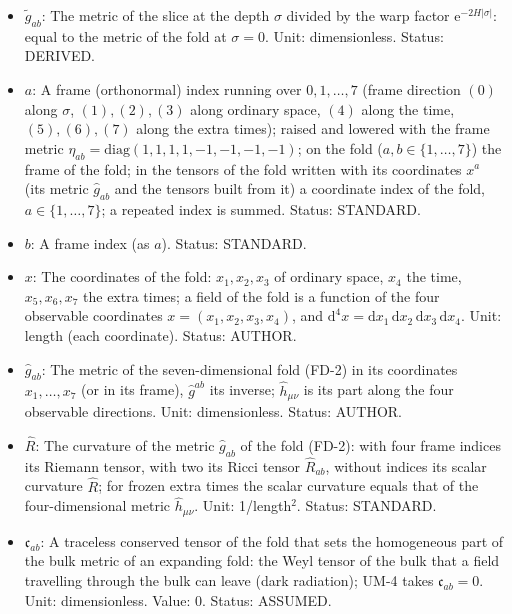 \documentclass[
  10pt,
]{article}
\begin{document}
\begin{itemize}
  \(\pi/(6H)\) of \(x_0\), the warp factor
  \(\mathrm{e}^{-2H\lvert\sigma\rvert}\) of the metric, the cosmological
  constant \(\Lambda = -21H^2\) and the tension
  \(\kappa\lambda_{\mathrm{F}} = 12H\) of the fold; in UM-4 a free
  parameter, bounded from below by the propagation of the gauge fields
  in the bulk. Unit: GeV (1/length). Value: \(H > 2534\) GeV, about 2.5
  TeV (from the invisible width of the Z boson). Status: AUTHOR.
\item
  \(\tilde g_{ab}\): The metric of the slice at the depth \(\sigma\)
  divided by the warp factor \(\mathrm{e}^{-2H\lvert\sigma\rvert}\):
  equal to the metric of the fold at \(\sigma = 0\). Unit:
  dimensionless. Status: DERIVED.
\item
  \(a\): A frame (orthonormal) index running over \(0, 1, \dots, 7\)
  (frame direction \((0)\) along \(\sigma\), \((1), (2), (3)\) along
  ordinary space, \((4)\) along the time, \((5), (6), (7)\) along the
  extra times); raised and lowered with the frame metric
  \(\eta_{ab} = \mathrm{diag}(1, 1, 1, 1, -1, -1, -1, -1)\); on the fold
  (\(a, b \in \{1, \dots, 7\}\)) the frame of the fold; in the tensors
  of the fold written with its coordinates \(x^a\) (its metric
  \(\hat g_{ab}\) and the tensors built from it) a coordinate index of
  the fold, \(a \in \{1, \dots, 7\}\); a repeated index is summed.
  Status: STANDARD.
\item
  \(b\): A frame index (as \(a\)). Status: STANDARD.
\item
  \(x\): The coordinates of the fold: \(x_1, x_2, x_3\) of ordinary
  space, \(x_4\) the time, \(x_5, x_6, x_7\) the extra times; a field of
  the fold is a function of the four observable coordinates
  \(x = (x_1, x_2, x_3, x_4)\), and
  \(\mathrm{d}^4x = \mathrm{d}x_1\,\mathrm{d}x_2\,\mathrm{d}x_3\,\mathrm{d}x_4\).
  Unit: length (each coordinate). Status: AUTHOR.
\item
  \(\hat g_{ab}\): The metric of the seven-dimensional fold (FD-2) in
  its coordinates \(x_1, \dots, x_7\) (or in its frame), \(\hat g^{ab}\)
  its inverse; \(\hat h_{\mu\nu}\) is its part along the four observable
  directions. Unit: dimensionless. Status: AUTHOR.
\item
  \(\hat R\): The curvature of the metric \(\hat g_{ab}\) of the fold
  (FD-2): with four frame indices its Riemann tensor, with two its Ricci
  tensor \(\hat R_{ab}\), without indices its scalar curvature
  \(\hat R\); for frozen extra times the scalar curvature equals that of
  the four-dimensional metric \(\hat h_{\mu\nu}\). Unit: 1/length\(^2\).
  Status: STANDARD.
\item
  \(\mathfrak{c}_{ab}\): A traceless conserved tensor of the fold that
  sets the homogeneous part of the bulk metric of an expanding fold: the
  Weyl tensor of the bulk that a field travelling through the bulk can
  leave (dark radiation); UM-4 takes \(\mathfrak{c}_{ab} = 0\). Unit:
  dimensionless. Value: 0. Status: ASSUMED.
\end{itemize}
\end{document}
